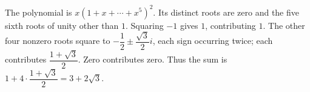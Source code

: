 The polynomial is $x(1+x+\cdots+x^5)^2$. Its distinct roots are zero and the five sixth roots of unity other than $1$. Squaring $-1$ gives $1$, contributing $1$. The other four nonzero roots square to $-\dfrac{1}{2}\pm\dfrac{\sqrt3}{2}i$, each sign occurring twice; each contributes $\dfrac{1+\sqrt3}{2}$. Zero contributes zero. Thus the sum is $\boxed{1+4\cdot\dfrac{1+\sqrt3}{2}=3+2\sqrt3}$.
